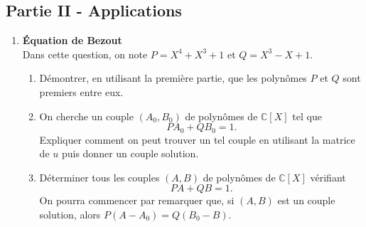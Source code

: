 \subsection*{Partie II - Applications}

\begin{enumerate}
\item \textbf{\'{E}quation de Bezout} \\
Dans cette question, on note $P=X^4+X^3+1$ et $Q=X^3-X+1$.
\begin{enumerate}
\item Démontrer, en utilisant la première partie, que les polynômes $P$ et $Q$ sont premiers entre eux.
\item On cherche un couple $(A_0,B_0)$ de polynômes de $\mathbb{C}[X]$ tel que
\[ P A_0 + Q B_0 = 1.\]
Expliquer comment on peut trouver un tel couple en utilisant la matrice de $u$ puis donner un couple solution.
\item Déterminer tous les couples $(A,B)$ de polynômes de $\mathbb{C}[X]$ vérifiant
\[ PA+QB=1.\]
On pourra commencer par remarquer que, si $(A,B)$ est un couple solution, alors $P(A-A_0)=Q(B_0-B)$.
\end{enumerate}




\end{enumerate}
